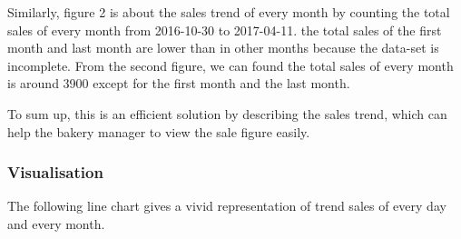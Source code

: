 \documentclass[11pt]{article}
\begin{document}
Similarly, figure 2 is about the sales trend of every month by counting
the total sales of every month from 2016-10-30 to 2017-04-11. the total
sales of the first month and last month are lower than in other months
because the data-set is incomplete. From the second figure, we can found
the total sales of every month is around 3900 except for the first month
and the last month.

To sum up, this is an efficient solution by describing the sales trend,
which can help the bakery manager to view the sale figure easily.

\hypertarget{visualisation}{%
\subsubsection{Visualisation}\label{visualisation}}

The following line chart gives a vivid representation of trend sales of
every day and every month.
\end{document}
